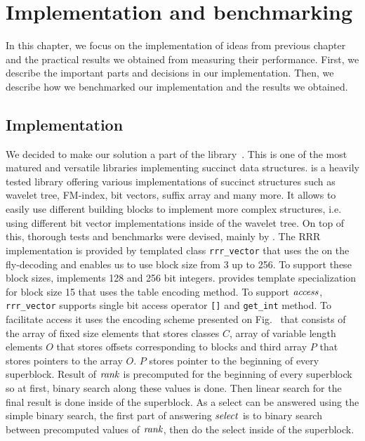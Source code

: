 \chapter{Implementation and benchmarking}
\label{kap:kap4}

In this chapter, we focus on the implementation of ideas from previous chapter
and the practical results we obtained from measuring their performance. First,
we describe the important parts and decisions in our implementation. Then, we
describe how we benchmarked our implementation and the results we obtained.

\section{Implementation}

We decided to make our solution a part of the \sdsl library~\citep{gog2014theory}. This
is one of the most matured and versatile libraries implementing succinct data structures.
\sdsl is a heavily tested library offering various implementations of succinct
structures such as wavelet tree, FM-index, bit vectors, suffix array and many more.
It allows to easily use different building blocks to implement more complex structures,
i.e. using different bit vector implementations inside of the wavelet tree. On top of this,
thorough tests and benchmarks were devised, mainly by \cite{gog2014optimized}.
The RRR implementation is provided by templated class \texttt{rrr\_vector} that uses the on the fly-decoding
and enables us to use block size from 3 up to 256. To support these block sizes, \sdsl implements
128 and 256 bit integers. \sdsl provides template
specialization for block size 15 that uses the table encoding method. To support $\mathit{access}$,
\texttt{rrr\_vector} supports single bit access operator \texttt{[]} and \texttt{get\_int} method.
To facilitate access it uses the encoding scheme presented on Fig.~\label{obr:RRRFinal} that
consists of the array of fixed size elements that stores classes $C$, array of variable length
elements $O$ that stores offsets corresponding to blocks and third array $P$ that stores pointers
to the array $O$. $P$ stores pointer to the beginning of every superblock. Result of $\mathit{rank}$ is
precomputed for the beginning of every superblock so at first, binary search along these values
is done. Then linear search for the final result is done inside of the superblock. As a select
can be answered using the simple binary search, the first part of answering $\mathit{select}$ is to
binary search between precomputed values of $\mathit{rank}$, then do the select inside of the superblock.
